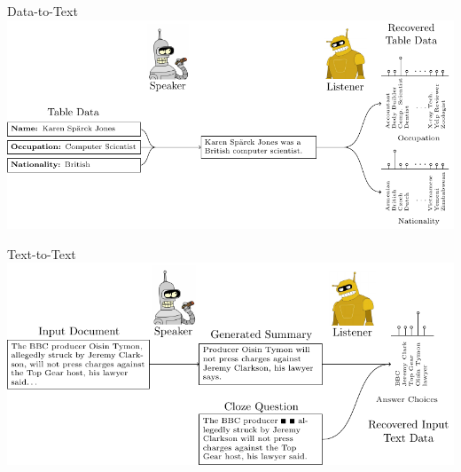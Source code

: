 \begin{frame}{Data-to-Text}
    \centering
    \includegraphics[scale=.8]{4_fg/image_texs/data2text/data2text.pdf}
\end{frame}
\begin{frame}{Text-to-Text}
    \centering
    \includegraphics[scale=.8]{4_fg/image_texs/text2text/text2text.pdf}
\end{frame}



